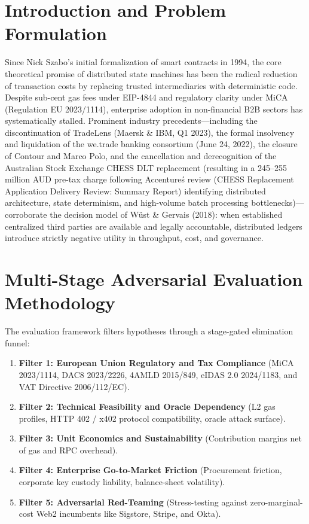 \documentclass[10pt,a4paper]{article}
\begin{document}
\section{Introduction and Problem Formulation}
Since Nick Szabo's initial formalization of smart contracts in 1994, the core theoretical promise of distributed state machines has been the radical reduction of transaction costs by replacing trusted intermediaries with deterministic code. Despite sub-cent gas fees under EIP-4844 and regulatory clarity under MiCA (Regulation EU 2023/1114), enterprise adoption in non-financial B2B sectors has systematically stalled. Prominent industry precedents---including the discontinuation of TradeLens (Maersk \& IBM, Q1 2023), the formal insolvency and liquidation of the we.trade banking consortium (June 24, 2022), the closure of Contour and Marco Polo, and the cancellation and derecognition of the Australian Stock Exchange CHESS DLT replacement (resulting in a 245--255 million AUD pre-tax charge following Accenture\'s review (CHESS Replacement Application Delivery Review: Summary Report) identifying distributed architecture, state determinism, and high-volume batch processing bottlenecks)---corroborate the decision model of W\"ust \& Gervais (2018): when established centralized third parties are available and legally accountable, distributed ledgers introduce strictly negative utility in throughput, cost, and governance.

\section{Multi-Stage Adversarial Evaluation Methodology}
The evaluation framework filters hypotheses through a stage-gated elimination funnel:
\begin{enumerate}
    \item \textbf{Filter 1: European Union Regulatory and Tax Compliance} (MiCA 2023/1114, DAC8 2023/2226, 4AMLD 2015/849, eIDAS 2.0 2024/1183, and VAT Directive 2006/112/EC).
    \item \textbf{Filter 2: Technical Feasibility and Oracle Dependency} (L2 gas profiles, HTTP 402 / x402 protocol compatibility, oracle attack surface).
    \item \textbf{Filter 3: Unit Economics and Sustainability} (Contribution margins net of gas and RPC overhead).
    \item \textbf{Filter 4: Enterprise Go-to-Market Friction} (Procurement friction, corporate key custody liability, balance-sheet volatility).
    \item \textbf{Filter 5: Adversarial Red-Teaming} (Stress-testing against zero-marginal-cost Web2 incumbents like Sigstore, Stripe, and Okta).
\end{enumerate}
\end{document}
